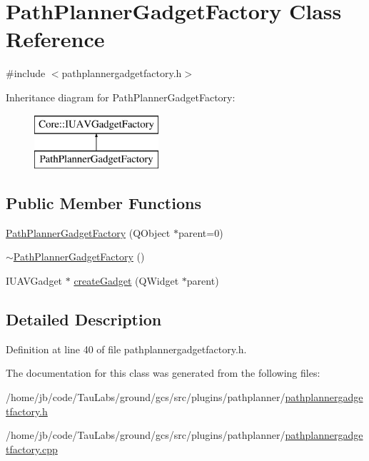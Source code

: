\hypertarget{class_path_planner_gadget_factory}{\section{\-Path\-Planner\-Gadget\-Factory \-Class \-Reference}
\label{class_path_planner_gadget_factory}
}


{\ttfamily \#include $<$pathplannergadgetfactory.\-h$>$}

\-Inheritance diagram for \-Path\-Planner\-Gadget\-Factory\-:\begin{figure}[H]
\begin{center}
\leavevmode
\includegraphics[height=2.000000cm]{class_path_planner_gadget_factory}
\end{center}
\end{figure}
\subsection*{\-Public \-Member \-Functions}
\begin{DoxyCompactItemize}
\item 
\hyperlink{group___path_planner_gadget_plugin_ga88e48bf90ce31bd235b33782dfe905e9}{\-Path\-Planner\-Gadget\-Factory} (\-Q\-Object $\ast$parent=0)
\item 
\hyperlink{group___path_planner_gadget_plugin_ga2dfd582034d463500837f0eaf0d01bd6}{$\sim$\-Path\-Planner\-Gadget\-Factory} ()
\item 
\-I\-U\-A\-V\-Gadget $\ast$ \hyperlink{group___path_planner_gadget_plugin_gaae19a3f321bbfe2ff8c6f75d2202d22e}{create\-Gadget} (\-Q\-Widget $\ast$parent)
\end{DoxyCompactItemize}


\subsection{\-Detailed \-Description}


\-Definition at line 40 of file pathplannergadgetfactory.\-h.



\-The documentation for this class was generated from the following files\-:\begin{DoxyCompactItemize}
\item 
/home/jb/code/\-Tau\-Labs/ground/gcs/src/plugins/pathplanner/\hyperlink{pathplannergadgetfactory_8h}{pathplannergadgetfactory.\-h}\item 
/home/jb/code/\-Tau\-Labs/ground/gcs/src/plugins/pathplanner/\hyperlink{pathplannergadgetfactory_8cpp}{pathplannergadgetfactory.\-cpp}\end{DoxyCompactItemize}
